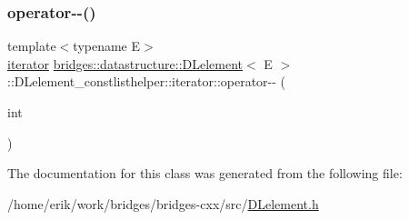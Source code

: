 \subsubsection{\texorpdfstring{operator-\/-\/()}{operator--()}\hspace{0.1cm}{\footnotesize\ttfamily [2/2]}}
{\footnotesize\ttfamily template$<$typename E$>$ \\
\hyperlink{classbridges_1_1datastructure_1_1_d_lelement_1_1_d_lelement__constlisthelper_1_1iterator}{iterator} \hyperlink{classbridges_1_1datastructure_1_1_d_lelement}{bridges\+::datastructure\+::\+D\+Lelement}$<$ E $>$\+::D\+Lelement\+\_\+constlisthelper\+::iterator\+::operator-\/-\/ (\begin{DoxyParamCaption}\item[{int}]{ }\end{DoxyParamCaption})\hspace{0.3cm}{\ttfamily [inline]}}



The documentation for this class was generated from the following file\+:\begin{DoxyCompactItemize}
\item 
/home/erik/work/bridges/bridges-\/cxx/src/\hyperlink{_d_lelement_8h}{D\+Lelement.\+h}\end{DoxyCompactItemize}
